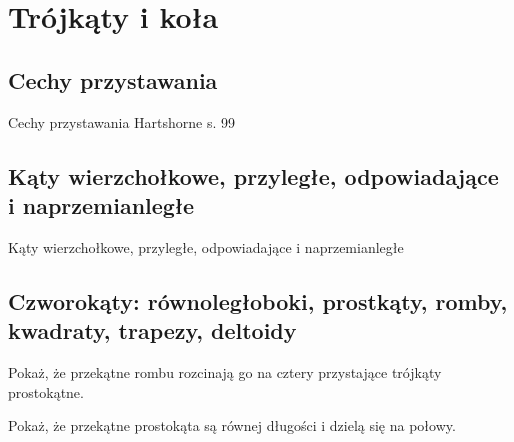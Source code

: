 \section{Trójkąty i koła}
\subsection{Cechy przystawania}
Cechy przystawania
\loremipsum
Hartshorne s. 99

\subsection{Kąty wierzchołkowe, przyległe, odpowiadające i naprzemianległe}
Kąty wierzchołkowe, przyległe, odpowiadające i naprzemianległe
\loremipsum





\subsection{Czworokąty: równoległoboki, prostkąty, romby, kwadraty, trapezy, deltoidy}
Pokaż, że przekątne rombu rozcinają go na cztery przystające trójkąty prostokątne. %

Pokaż, że przekątne prostokąta są równej długości i dzielą się na połowy. %



